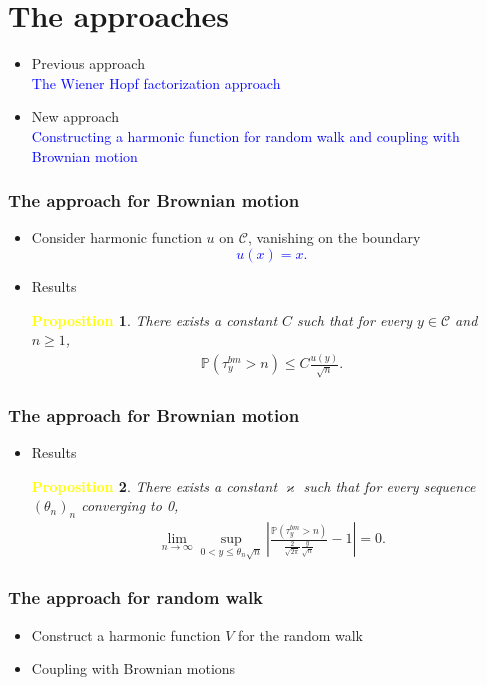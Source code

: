 \documentclass[serif,professionalfont,tree,usepdftitle=false, slidestop]{beamer}
\numberwithin{equation}{section}
\newcommand{\duong}[1]{\textcolor{blue}{#1}}
\newcommand{\vang}[1]{\textcolor{yellow}{#1}}
\begin{document}
\section{The approaches}
\begin{frame}
\begin{itemize}
\item Previous approach\\
\duong{The Wiener Hopf factorization approach }
\item New approach\\
\duong{Constructing a harmonic function for random walk and coupling with Brownian motion}
\end{itemize}
\end{frame}
\begin{frame}
\frametitle{The approach for Brownian motion} 
\begin{itemize}
\item Consider harmonic function $u$ on $\mathcal C$, vanishing on the boundary
\duong{
$$u(x) = x.$$
}
\item Results
\newtheorem*{thm1}{\vang{\large \bf Proposition}}
\begin{thm1}
There exists a constant $C$ such that for every $ y\in \mathcal C$ and $n\ge 1$,
\begin{eqnarray}
\mathbb P(\tau_{y}^{bm} > n)\le C\frac{u(y)}{\sqrt{n}}.\nonumber
\end{eqnarray}
\end{thm1}
\end{itemize}
\end{frame}
\begin{frame}
\frametitle{The approach for Brownian motion} 
\begin{itemize}
\item Results
\begin{thm1}
There exists a constant $\varkappa$ such that for every sequence $(\theta_n)_n$ converging to 0, 
\begin{eqnarray}\label{dw24}
\lim_{n\to\infty}\sup_{0<y\le \theta_n\sqrt{n}} \left|\frac{\mathbb P(\tau_{y}^{bm} > n)}{\textstyle \frac{2}{\sqrt {2\pi}}\frac{y}{\sqrt n}}-1\right| = 0.\nonumber
\end{eqnarray}
\end{thm1}
\end{itemize}
\end{frame}
\begin{frame}
\frametitle{The approach for random walk} 
\begin{itemize}
\item Construct a harmonic function $V$ for the random walk
\item Coupling with Brownian motions
\end{itemize}
\end{frame}
\end{document}

